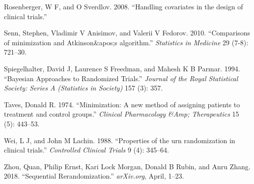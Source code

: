 \documentclass[12pt,oneside]{book}
\newlength{\li}\setlength{\li}{14.48pt}
\newlength{\di}\setlength{\di}{-3.5mm}
\theoremstyle{definition}
\theoremstyle{definition}
\theoremstyle{definition}
\theoremstyle{remark}
\begin{document}
\leavevmode\hypertarget{ref-Rosenberger:2008cm}{}%
Rosenberger, W F, and O Sverdlov. 2008. ``Handling covariates in the
design of clinical trials.''

\leavevmode\hypertarget{ref-Senn:2010bg}{}%
Senn, Stephen, Vladimir V Anisimov, and Valerii V Fedorov. 2010.
``Comparisons of minimization and Atkinson\&apos;s algorithm.''
\emph{Statistics in Medicine} 29 (7-8): 721--30.

\leavevmode\hypertarget{ref-Spiegelhalter:1994cn}{}%
Spiegelhalter, David J, Laurence S Freedman, and Mahesh K B Parmar.
1994. ``Bayesian Approaches to Randomized Trials.'' \emph{Journal of the
Royal Statistical Society: Series A (Statistics in Society)} 157 (3):
357.

\leavevmode\hypertarget{ref-Taves:1974hn}{}%
Taves, Donald R. 1974. ``Minimization: A new method of assigning
patients to treatment and control groups.'' \emph{Clinical Pharmacology
\&Amp; Therapeutics} 15 (5): 443--53.

\leavevmode\hypertarget{ref-Wei:1988if}{}%
Wei, L J, and John M Lachin. 1988. ``Properties of the urn randomization
in clinical trials.'' \emph{Controlled Clinical Trials} 9 (4): 345--64.

\leavevmode\hypertarget{ref-Quan:SeqRerand}{}%
Zhou, Quan, Philip Ernst, Kari Lock Morgan, Donald B Rubin, and Anru
Zhang. 2018. ``Sequential Rerandomization.'' \emph{arXiv.org}, April,
1--23.
\end{document}
